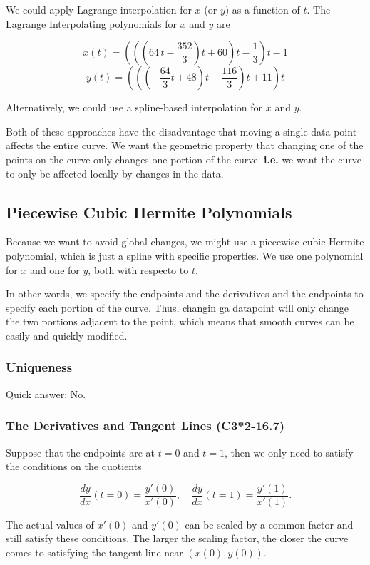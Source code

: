\documentclass[12pt]{article}
\newcommand{\ie}{\textbf{i.e.}\xspace}
\begin{document}
We could apply Lagrange interpolation for $x$ (or $y$) as a function of $t$.
The Lagrange Interpolating polynomials for $x$ and $y$ are

\[
x(t) = \left(\left(\left(64\,t - \frac{352}{3}\right)t + 60\right)t - \frac{1}{3}\right)t - 1
\]
\[
y(t) = \left(\left(\left(-\frac{64}{3}t + 48\right)t - \frac{116}{3}\right)t + 11\right)t
\] 

Alternatively, we could use a spline-based interpolation for $x$ and $y$.

Both of these approaches have the disadvantage that moving a single data point
affects the entire curve. We want the geometric property that changing one of
the points on the curve only changes one portion of the curve. \ie we want the
curve to only be affected locally by changes in the data.

\subsection{Piecewise Cubic Hermite Polynomials}
Because we want to avoid global changes, we might use a piecewise cubic Hermite
polynomial, which is just a spline with specific properties. We use one
polynomial for $x$ and one for $y$, both with respecto to $t$.

In other words, we specify the endpoints and the derivatives and the endpoints
to specify each portion of the curve. Thus, changin ga datapoint will only
change the two portions adjacent to the point, which means that smooth curves
can be easily and quickly modified.

\subsubsection{Uniqueness}

Quick answer: No.

\subsubsection{The Derivatives and Tangent Lines (C3*2-16.7)}
Suppose that the endpoints are at $t=0$ and $t=1$, then we only need to satisfy
the conditions on the quotients

\[
\frac{dy}{dx} (t=0) = \frac{y'(0)}{x'(0)}, \quad \frac{dy}{dx} (t=1)
= \frac{y'(1)}{x'(1)}
.\]

The actual values of $x'(0)$ and $y'(0)$ can be scaled by a common factor and
still satisfy these conditions. The larger the scaling factor, the closer the
curve comes to satisfying the tangent line near $(x(0), y(0))$.
\end{document}
